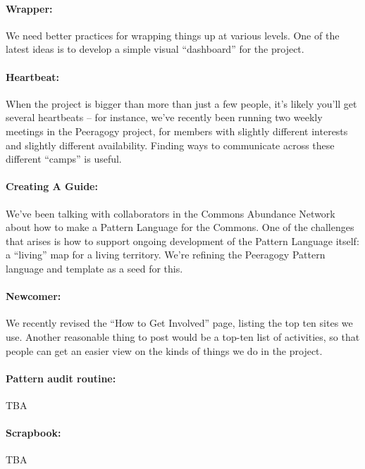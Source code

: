 \paragraph{Wrapper:}  We need better practices for wrapping things up at
various levels.  One of the latest ideas is to develop a simple visual
``dashboard'' for the project.

\paragraph{Heartbeat:} When the project is bigger than more than just a few people, it’s likely
you’ll get several heartbeats – for instance, we’ve recently been
running two weekly meetings in the Peeragogy project, for members with
slightly different interests and slightly different availability.
Finding ways to communicate across these different “camps” is useful.

\paragraph{Creating A Guide:} We’ve been talking with collaborators in the Commons Abundance Network
about how to make a Pattern Language for the Commons. One of the
challenges that arises is how to support ongoing development of the
Pattern Language itself: a “living” map for a living territory. We’re
refining the Peeragogy Pattern language and template as a seed for this.

\paragraph{Newcomer:} We recently revised the “How to Get Involved” page, listing the top ten
sites we use. Another reasonable thing to post would be a top-ten list
of activities, so that people can get an easier view on the kinds of
things we do in the project.

\paragraph{Pattern audit routine:}  TBA

\paragraph{Scrapbook:} TBA




